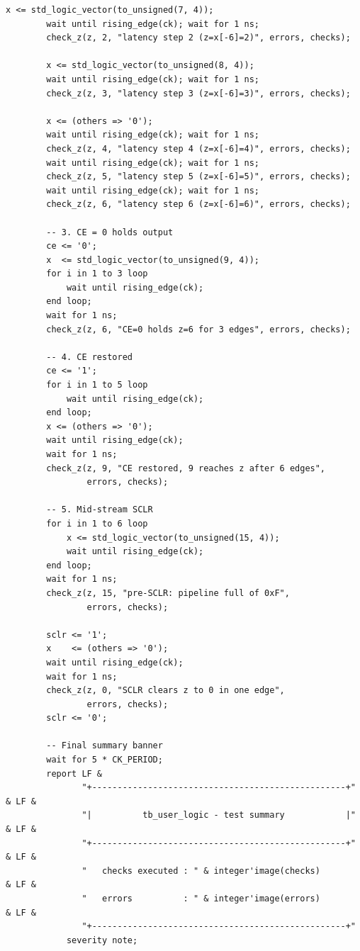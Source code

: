 \documentclass[11pt,letterpaper]{article}
\begin{document}
\begin{lstlisting}[caption={tb\_user\_logic.vhd -- self-checking testbench},
                   label={lst:tb}]
        x <= std_logic_vector(to_unsigned(7, 4));
        wait until rising_edge(ck); wait for 1 ns;
        check_z(z, 2, "latency step 2 (z=x[-6]=2)", errors, checks);

        x <= std_logic_vector(to_unsigned(8, 4));
        wait until rising_edge(ck); wait for 1 ns;
        check_z(z, 3, "latency step 3 (z=x[-6]=3)", errors, checks);

        x <= (others => '0');
        wait until rising_edge(ck); wait for 1 ns;
        check_z(z, 4, "latency step 4 (z=x[-6]=4)", errors, checks);
        wait until rising_edge(ck); wait for 1 ns;
        check_z(z, 5, "latency step 5 (z=x[-6]=5)", errors, checks);
        wait until rising_edge(ck); wait for 1 ns;
        check_z(z, 6, "latency step 6 (z=x[-6]=6)", errors, checks);

        -- 3. CE = 0 holds output
        ce <= '0';
        x  <= std_logic_vector(to_unsigned(9, 4));
        for i in 1 to 3 loop
            wait until rising_edge(ck);
        end loop;
        wait for 1 ns;
        check_z(z, 6, "CE=0 holds z=6 for 3 edges", errors, checks);

        -- 4. CE restored
        ce <= '1';
        for i in 1 to 5 loop
            wait until rising_edge(ck);
        end loop;
        x <= (others => '0');
        wait until rising_edge(ck);
        wait for 1 ns;
        check_z(z, 9, "CE restored, 9 reaches z after 6 edges",
                errors, checks);

        -- 5. Mid-stream SCLR
        for i in 1 to 6 loop
            x <= std_logic_vector(to_unsigned(15, 4));
            wait until rising_edge(ck);
        end loop;
        wait for 1 ns;
        check_z(z, 15, "pre-SCLR: pipeline full of 0xF",
                errors, checks);

        sclr <= '1';
        x    <= (others => '0');
        wait until rising_edge(ck);
        wait for 1 ns;
        check_z(z, 0, "SCLR clears z to 0 in one edge",
                errors, checks);
        sclr <= '0';

        -- Final summary banner
        wait for 5 * CK_PERIOD;
        report LF &
               "+--------------------------------------------------+" & LF &
               "|          tb_user_logic - test summary            |" & LF &
               "+--------------------------------------------------+" & LF &
               "   checks executed : " & integer'image(checks)         & LF &
               "   errors          : " & integer'image(errors)         & LF &
               "+--------------------------------------------------+"
            severity note;


\end{lstlisting}
\end{document}
